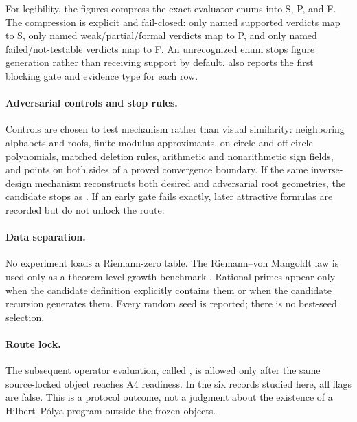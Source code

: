 For legibility, the figures compress the exact evaluator enums into S, P, and
F.  The compression is explicit and fail-closed: only named supported verdicts
map to S, only named weak/partial/formal verdicts map to P, and only named
failed/not-testable verdicts map to F.  An unrecognized enum stops figure
generation rather than receiving support by default.
 also reports the first blocking gate and evidence
type for each row.

\paragraph{Adversarial controls and stop rules.}
Controls are chosen to test mechanism rather than visual similarity:
neighboring alphabets and roofs, finite-modulus approximants, on-circle and
off-circle polynomials, matched deletion rules, arithmetic and nonarithmetic
sign fields, and points on both sides of a proved convergence boundary.  If
the same inverse-design mechanism reconstructs both desired and adversarial
root geometries, the candidate stops as .  If an
early gate fails exactly, later attractive formulas are recorded but do not
unlock the route.

\paragraph{Data separation.}
No experiment loads a Riemann-zero table.  The Riemann--von Mangoldt law is
used only as a theorem-level growth benchmark \citep{dlmf2510}.  Rational
primes appear only when the candidate definition explicitly contains them or
when the candidate recursion generates them.  Every random seed is reported;
there is no best-seed selection.

\paragraph{Route lock.}
The subsequent operator evaluation, called \RouteB, is allowed only after the
same source-locked object reaches A4 readiness.  In the six records studied
here, all \RouteB{} flags are false.  This is a protocol outcome, not a
judgment about the existence of a Hilbert--Pólya program outside the frozen
objects.
